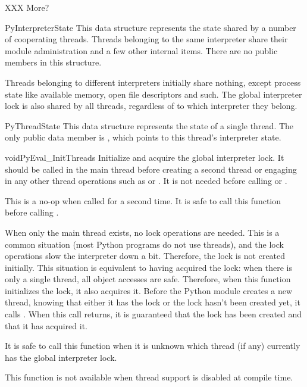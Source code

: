 \documentclass{manual}
\begin{document}
XXX More?

\begin{ctypedesc}{PyInterpreterState}
This data structure represents the state shared by a number of
cooperating threads.  Threads belonging to the same interpreter
share their module administration and a few other internal items.
There are no public members in this structure.

Threads belonging to different interpreters initially share nothing,
except process state like available memory, open file descriptors and
such.  The global interpreter lock is also shared by all threads,
regardless of to which interpreter they belong.
\end{ctypedesc}

\begin{ctypedesc}{PyThreadState}
This data structure represents the state of a single thread.  The only
public data member is ,
which points to this thread's interpreter state.
\end{ctypedesc}

\begin{cfuncdesc}{void}{PyEval_InitThreads}{}
Initialize and acquire the global interpreter lock.  It should be
called in the main thread before creating a second thread or engaging
in any other thread operations such as
 or
.  It is not needed before
calling  or
.

This is a no-op when called for a second time.  It is safe to call
this function before calling .

When only the main thread exists, no lock operations are needed.  This
is a common situation (most Python programs do not use threads), and
the lock operations slow the interpreter down a bit.  Therefore, the
lock is not created initially.  This situation is equivalent to having
acquired the lock: when there is only a single thread, all object
accesses are safe.  Therefore, when this function initializes the
lock, it also acquires it.  Before the Python
 module creates a new thread,
knowing that either it has the lock or the lock hasn't been created
yet, it calls .  When this call
returns, it is guaranteed that the lock has been created and that it
has acquired it.

It is  safe to call this function when it is unknown which
thread (if any) currently has the global interpreter lock.

This function is not available when thread support is disabled at
compile time.
\end{cfuncdesc}
\end{document}
